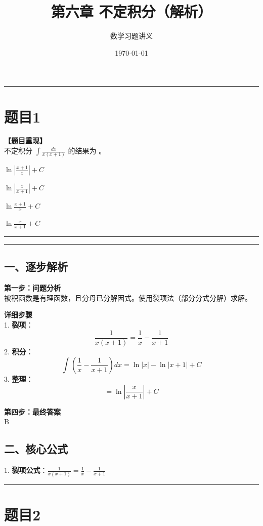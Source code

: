 \documentclass[12pt, a4paper]{ctexart}
\newcommand{\TopSeparator}{
    \par\noindent\rule{\textwidth}{1.5pt}\vspace{0.5em} %
}
\newcommand{\AnalysisSeparator}{
    \par\noindent\rule{\textwidth}{0.5pt}\vspace{0.2em}\hrule\vspace{0.5em} %
}
\newenvironment{RedAnalysis}{
    \par
    \color{red} %
}{
    \par
    \color{black} %
}
\newcommand{\choicesFour}[4]{
    \begin{enumerate}[label=\Alph*., itemsep=0pt, parsep=0pt, topsep=5pt, labelsep=0.5em]
        \begin{minipage}{0.22\linewidth} \item #1 \end{minipage}
        \begin{minipage}{0.22\linewidth} \item #2 \end{minipage}
        \begin{minipage}{0.22\linewidth} \item #3 \end{minipage}
        \begin{minipage}{0.22\linewidth} \item #4 \end{minipage}
    \end{enumerate}
}
\begin{document}
\title{\textbf{第六章 不定积分（解析）}}
\author{数学习题讲义}
\date{\today}
\maketitle

\TopSeparator
\section*{题目1}

\textbf{【题目重现】} \\
不定积分 $ \int\frac{dx}{x(x+1)} $ 的结果为 \underline{\hspace{1cm}}。
\choicesFour{$ \ln|\frac{x+1}{x}|+C $}{$ \ln|\frac{x}{x+1}|+C $}{$ \ln\frac{x+1}{x}+C $}{$ \ln\frac{x}{x+1}+C $}

\AnalysisSeparator

\begin{RedAnalysis}

\subsection*{一、逐步解析}

\textbf{第一步：问题分析} \\
被积函数是有理函数，且分母已分解因式。使用裂项法（部分分式分解）求解。

\textbf{详细步骤} \\
1. \textbf{裂项}：
   \[ \frac{1}{x(x+1)} = \frac{1}{x} - \frac{1}{x+1} \]
2. \textbf{积分}：
   \[ \int (\frac{1}{x} - \frac{1}{x+1}) dx = \ln|x| - \ln|x+1| + C \]
3. \textbf{整理}：
   \[ = \ln \left| \frac{x}{x+1} \right| + C \]

\textbf{第四步：最终答案} \\
B

\subsection*{二、核心公式}
1. \textbf{裂项公式}：$\frac{1}{x(x+1)} = \frac{1}{x} - \frac{1}{x+1}$

\end{RedAnalysis}

\vspace{2em}

\TopSeparator
\section*{题目2}
\end{document}

